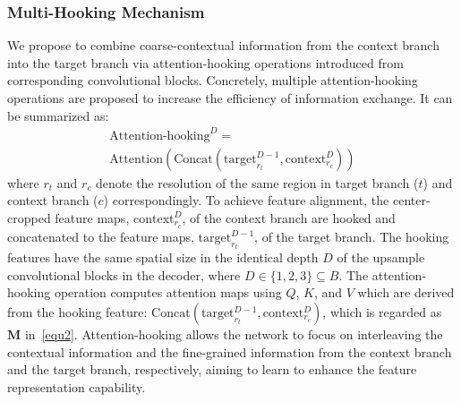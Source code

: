 \documentclass[lettersize,journal,siunitx]{IEEEtran}
\begin{document}
\subsubsection{Multi-Hooking Mechanism}
We propose to combine coarse-contextual information from the context branch into the target branch via attention-hooking operations introduced from corresponding convolutional blocks. Concretely, multiple attention-hooking operations are proposed to increase the efficiency of information exchange. It can be summarized as:
\begin{multline}
    \mathrm{Attention\mbox{-}hooking}^{D}=\\ \mathrm{Attention}(\mathrm{Concat}(\mathrm{target}^{D-1}_{r_{t}}, \mathrm{context}^{D}_{r_{c}}))
\label{equ3}
\end{multline}
where $r_{t}$ and $r_{c}$ denote the resolution of the same region in target branch ($t$) and context branch (${c}$) correspondingly. To achieve feature alignment, the center-cropped feature maps, $\mathrm{context}^{D}_{r_{c}}$, of the context branch are hooked and concatenated to the feature maps, $\mathrm{target}^{D-1}_{r_{t}}$, of the target branch. The hooking features have the same spatial size in the identical depth $D$ of the upsample convolutional blocks in the decoder, where $D\in{\{1,2,3\}}\subseteq{B}$. The attention-hooking operation computes attention maps using $Q$, $K$, and $V$ which are derived from the hooking feature: $\mathrm{Concat}(\mathrm{target}^{D-1}_{r_{t}}, \mathrm{context}^{D}_{r_{c}})$, which is regarded as $\bm{M}$ in~\cref{equ2}. Attention-hooking allows the network to focus on interleaving the contextual information and the fine-grained information from the context branch and the target branch, respectively, aiming to learn to enhance the feature representation capability.
\end{document}
